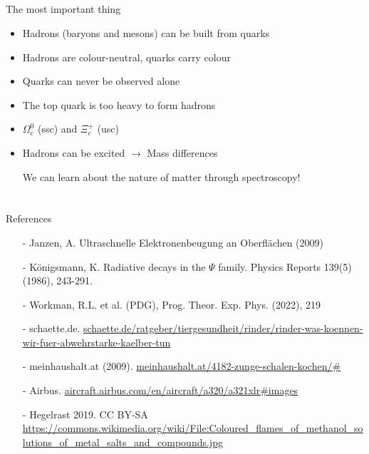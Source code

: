 \subsection{}
\begin{frame}{The most important thing}
    \begin{itemize}
        \item Hadrons (baryons and mesons) can be built from quarks
        \item Hadrons are colour-neutral, quarks carry colour
        \item Quarks can never be observed alone
        \item The top quark is too heavy to form hadrons
        \item $\Omega_c^0$ (ssc) and $\Xi_c^+$ (usc)
        \item Hadrons can be excited $\rightarrow$ Mass differences 
        \item [\ding{43}] We can learn about the nature of matter through spectroscopy!
    \end{itemize}
 \end{frame}
\section{}
\begin{frame}{References}\footnotesize
    \begin{itemize}
    \item[-] Janzen, A. Ultraschnelle Elektronenbeugung an Oberflächen (2009)
    \item[-] Königsmann, K. Radiative decays in the $\Psi$ family. Physics Reports 139(5)(1986), 243-291.
    \item[-] Workman, R.L. et al. (PDG), Prog. Theor. Exp. Phys. (2022), 219
\item[-] schaette.de. \url{schaette.de/ratgeber/tiergesundheit/rinder/rinder-was-koennen-wir-fuer-abwehrstarke-kaelber-tun}
\item[-] meinhaushalt.at (2009). \url{meinhaushalt.at/4182-zunge-schalen-kochen/#}
\item[-] Airbus. \url{aircraft.airbus.com/en/aircraft/a320/a321xlr#images}
\item[-] Hegelrast 2019. CC BY-SA \url{https://commons.wikimedia.org/wiki/File:Coloured_flames_of_methanol_solutions_of_metal_salts_and_compounds.jpg} 


    \end{itemize}
\end{frame}

